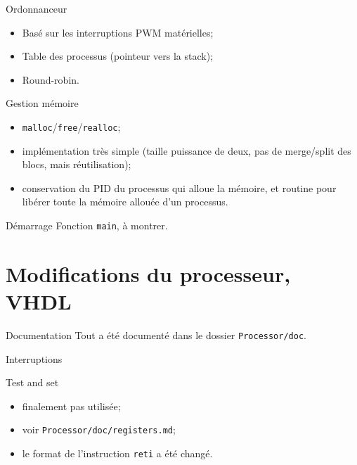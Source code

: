 \documentclass{beamer}
\begin{document}
    \begin{frame}[fragile]{Ordonnanceur}
      \begin{itemize}
        \item Basé sur les interruptions PWM matérielles;
        \item Table des processus (pointeur vers la stack);
        \item Round-robin.
      \end{itemize}
\end{frame}

    \begin{frame}[fragile]{Gestion mémoire}
      \begin{itemize}
        \item \verb+malloc+/\verb+free+/\verb+realloc+;
        \item implémentation très simple (taille puissance de deux, pas de
          merge/split des blocs, mais réutilisation);
        \item conservation du PID du processus qui alloue la mémoire, et routine
          pour libérer toute la mémoire allouée d'un processus.
      \end{itemize}
\end{frame}

    \begin{frame}[fragile]{Démarrage}
        Fonction \verb+main+, à montrer.
\end{frame}

  \section{Modifications du processeur, VHDL}
    \begin{frame}[fragile]{Documentation}
      Tout a été documenté dans le dossier \verb+Processor/doc+.
\end{frame}

    \begin{frame}{Interruptions}
    \end{frame}

    \begin{frame}[fragile]{Test and set}
      \begin{itemize}
        \item finalement pas utilisée;
        \item voir \verb+Processor/doc/registers.md+;
        \item le format de l'instruction \verb+reti+ a été changé.
      \end{itemize}
\end{frame}
\end{document}
